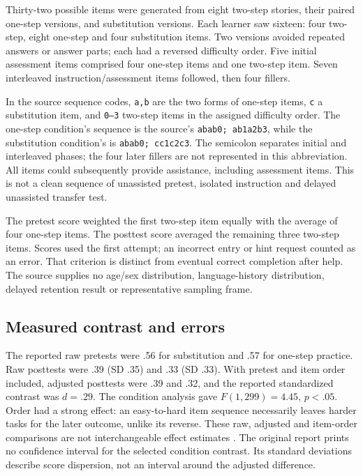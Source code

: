 Thirty-two possible items were generated from eight two-step stories,
their paired one-step versions, and substitution versions. Each learner
saw sixteen: four two-step, eight one-step and four substitution items.
Two versions avoided repeated answers or answer parts; each had a
reversed difficulty order. Five initial assessment items comprised
four one-step items and one two-step item. Seven interleaved
instruction/assessment items followed, then four fillers.

In the source sequence codes, \texttt{a,b} are the two forms
of one-step items, \texttt{c} a substitution item, and
\texttt{0--3} two-step items in the assigned difficulty order.
The one-step condition's sequence is the source's
\texttt{abab0; ab1a2b3}, while the substitution condition's is
\texttt{abab0; cc1c2c3}.
The semicolon separates initial and interleaved phases; the four
later fillers are not represented in this abbreviation.
All items could subsequently provide assistance, including assessment
items. This is not a clean sequence of unassisted pretest, isolated
instruction and delayed unassisted transfer test.

The pretest score weighted the first two-step item equally with
the average of four one-step items. The posttest score averaged the
remaining three two-step items. Scores used the first attempt;
an incorrect entry or hint request counted as an error.
That criterion is distinct from eventual correct completion after
help. The source supplies no age/sex distribution, language-history
distribution, delayed retention result or representative sampling frame.

\subsection{Measured contrast and errors}

The reported raw pretests were .56 for substitution and .57 for
one-step practice. Raw posttests were .39 (SD .35) and .33 (SD .33).
With pretest and item order included, adjusted posttests were .39
and .32, and the reported standardized contrast was \(d=.29\).
The condition analysis gave \(F(1,299)=4.45\), \(p<.05\).
Order had a strong effect: an easy-to-hard item sequence necessarily
leaves harder tasks for the later outcome, unlike its reverse.
These raw, adjusted and item-order comparisons are not interchangeable
effect estimates \cite[p.~474]{KoedingerMcLaughlin2010LanguageTransfer}.
The original report prints no confidence interval for the selected
condition contrast. Its standard deviations describe score dispersion,
not an interval around the adjusted difference.

